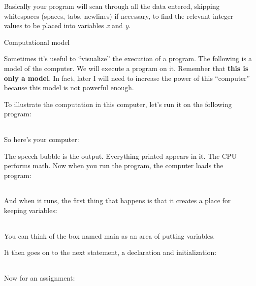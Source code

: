\documentclass[
]{article}
\begin{document}
Basically your program will scan through all the data entered, skipping
whitespaces (spaces, tabs, newlines) if necessary, to find the relevant
integer values to be placed into variables \emph{x} and \emph{y}.

Computational model

Sometimes it's useful to ``visualize'' the execution of a program. The
following is a model of the computer. We will execute a program on it.
Remember that \textbf{this is only a model}. In fact, later I will need
to increase the power of this ``computer'' because this model is not
powerful enough.

To illustrate the computation in this computer, let's run it on the
following program:

\begin{longtable}[]{@{}@{}}
\toprule
\endhead
\bottomrule
\end{longtable}

So here's your computer:

The speech bubble is the output. Everything printed appears in it. The
CPU performs math. Now when you run the program, the computer loads the
program:

\begin{longtable}[]{@{}@{}}
\toprule
\endhead
\bottomrule
\end{longtable}

And when it runs, the first thing that happens is that it creates a
place for keeping variables:

\begin{longtable}[]{@{}@{}}
\toprule
\endhead
\bottomrule
\end{longtable}

You can think of the box named main as an area of putting variables.

It then goes on to the next statement, a declaration and initialization:

\begin{longtable}[]{@{}@{}}
\toprule
\endhead
\bottomrule
\end{longtable}

Now for an assignment:

\begin{longtable}[]{@{}@{}}
\toprule
\endhead
\bottomrule
\end{longtable}

\begin{longtable}[]{@{}@{}}
\toprule
\endhead
\bottomrule
\end{longtable}
\end{document}
